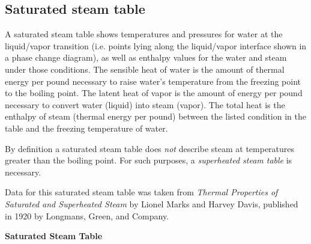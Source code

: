 \filbreak
\subsection{Saturated steam table}

A saturated steam table shows temperatures and pressures for water at the liquid/vapor transition (i.e. points lying along the liquid/vapor interface shown in a phase change diagram), as well as enthalpy values for the water and steam under those conditions.  The sensible heat of water is the amount of thermal energy per pound necessary to raise water's temperature from the freezing point to the boiling point.  The latent heat of vapor is the amount of energy per pound necessary to convert water (liquid) into steam (vapor).  The total heat is the enthalpy of steam (thermal energy per pound) between the listed condition in the table and the freezing temperature of water.

\vskip 10pt

By definition a saturated steam table does \textit{not} describe steam at temperatures greater than the boiling point.  For such purposes, a \textit{superheated steam table} is necessary.

\vskip 10pt

\filbreak

Data for this saturated steam table was taken from \textit{Thermal Properties of Saturated and Superheated Steam} by Lionel Marks and Harvey Davis, published in 1920 by Longmans, Green, and Company. 

\vskip 10pt

\centerline{\textbf{Saturated Steam Table}}


